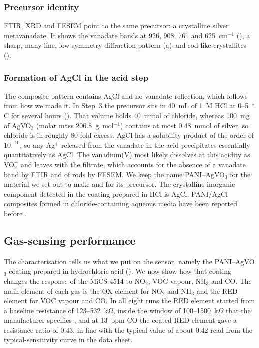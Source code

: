 \documentclass[preprint,11pt]{elsarticle}
\begin{document}
\subsubsection{Precursor identity}
FTIR, XRD and FESEM point to the same precursor: a crystalline silver metavanadate. It shows the vanadate bands at 926, 908, 761 and 625~cm$^{-1}$ (), a sharp, many-line, low-symmetry diffraction pattern (a) and rod-like crystallites ().

\subsubsection{Formation of AgCl in the acid step}
The composite pattern contains AgCl and no vanadate reflection, which follows from how we made it. In Step~3 the precursor sits in 40~mL of 1~M HCl at 0--5~$^{\circ}$C for several hours (). That volume holds 40~mmol of chloride, whereas 100~mg of AgVO$_3$ (molar mass 206.8~g~mol$^{-1}$) contains at most 0.48~mmol of silver, so chloride is in roughly 80-fold excess. AgCl has a solubility product of the order of $10^{-10}$, so any Ag$^{+}$ released from the vanadate in the acid precipitates essentially quantitatively as AgCl. The vanadium(V) most likely dissolves at this acidity as VO$_2^{+}$ and leaves with the filtrate, which accounts for the absence of a vanadate band by FTIR and of rods by FESEM. We keep the name PANI--AgVO$_3$ for the material we set out to make and for its precursor. The crystalline inorganic component detected in the coating prepared in HCl is AgCl. PANI/AgCl composites formed in chloride-containing aqueous media have been reported before \cite{benahmed2018paniagcl,vohra2013agclpani}.

\subsection{Gas-sensing performance}
\label{sec:gassensing}
The characterisation tells us what we put on the sensor, namely the PANI--AgVO$_3$ coating prepared in hydrochloric acid (). We now show how that coating changes the response of the MiCS-4514 to NO$_2$, VOC vapour, NH$_3$ and CO. The main element of each gas is the OX element for NO$_2$ and NH$_3$ and the RED element for VOC vapour and CO. In all eight runs the RED element started from a baseline resistance of 123--532~k$\Omega$, inside the window of 100--1500~k$\Omega$ that the manufacturer specifies \cite{sgx2019mics4514}, and at 13~ppm CO the coated RED element gave a resistance ratio of 0.43, in line with the typical value of about 0.42 read from the typical-sensitivity curve in the data sheet.
\end{document}

